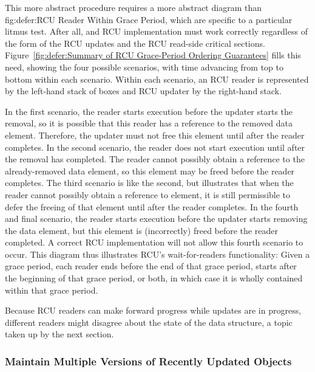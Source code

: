 This more abstract procedure requires a more abstract diagram than
{fig:defer:RCU Reader Within Grace Period},
which are specific to a particular litmus test.
After all, and RCU implementation must work correctly regardless of
the form of the RCU updates and the RCU read-side critical sections.
Figure~\ref{fig:defer:Summary of RCU Grace-Period Ordering Guarantees}
fills this need, showing the four possible scenarios, with time
advancing from top to bottom within each scenario.
Within each scenario, an RCU reader is represented by the left-hand
stack of boxes and RCU updater by the right-hand stack.

In the first scenario, the reader starts execution before the
updater starts the removal, so it is possible that this reader
has a reference to the removed data element.
Therefore, the updater must not free this element until after the
reader completes.
In the second scenario, the reader does not start execution until
after the removal has completed.
The reader cannot possibly obtain a reference to the already-removed
data element, so this element may be freed before the reader completes.
The third scenario is like the second, but illustrates that when the
reader cannot possibly obtain a reference to element, it is still
permissible to defer the freeing of that element until after the
reader completes.
In the fourth and final scenario, the reader starts execution before
the updater starts removing the data element, but this element
is (incorrectly) freed before the reader completed.
A correct RCU implementation will not allow this fourth scenario to
occur.
This diagram thus illustrates RCU's wait-for-readers functionality:
Given a grace period, each reader ends before the end of that grace
period, starts after the beginning of that grace period, or both, in
which case it is wholly contained within that grace period.

Because RCU readers can make forward progress while updates
are in progress, different readers might disagree about the state
of the data structure, a topic taken up by the next section.

\subsubsection{Maintain Multiple Versions of Recently Updated Objects}
\label{sec:defer:Maintain Multiple Versions of Recently Updated Objects}

